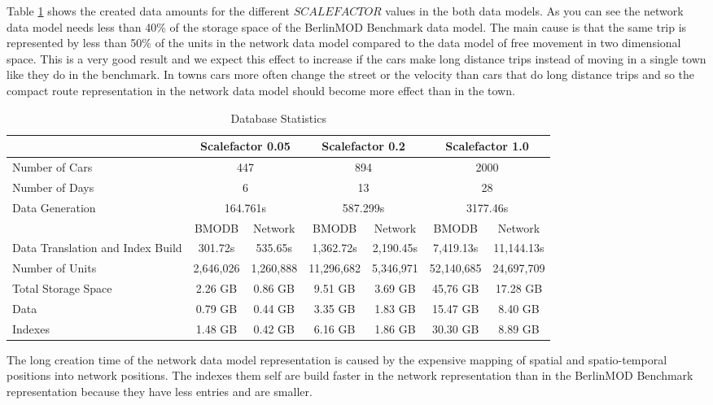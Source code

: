 \documentclass[a4paper]{article}
\newcommand{\bmodb} {BerlinMOD Benchmark}
\begin{document}
{Table \ref{tab:dbstat} shows the created data amounts for the different $SCALEFACTOR$
values in the both data models. As you can see the network data model needs less
than 40\% of the storage space of the \bmodb{} data model. The main cause is that
the same trip is represented by less than 50\% of the units in the network data model
compared to the data model of free movement in two dimensional space. This is a very
good result and we expect this effect to increase if the cars make long distance
trips instead of moving in a single town like they do in the benchmark. In towns
cars more often change the street or the velocity than cars that do long distance
trips and so the compact route representation in the network data model should become
more effect than in the town.
\begin{table}[H]
\begin{center}
\begin{scriptsize}
\begin{tabularx}{1.0\textwidth}{|X|c|c|c|c|c|c|}
\hline
&\multicolumn{2}{c|}{\textbf{Scalefactor 0.05}}&\multicolumn{2}{c|}{\textbf{Scalefactor 0.2}}&\multicolumn{2}{c|}{\textbf{Scalefactor 1.0}}\\
\hline
Number of Cars&\multicolumn{2}{c|}{447}&\multicolumn{2}{c|}{894}&\multicolumn{2}{c|}{2000}\\
\hline
Number of Days&\multicolumn{2}{c|}{6}&\multicolumn{2}{c|}{13}&\multicolumn{2}{c|}{28}\\
\hline
Data Generation&\multicolumn{2}{c|}{164.761s}&\multicolumn{2}{c|}{587.299s}&\multicolumn{2}{c|}{3177.46s}\\
\hline
&BMODB&Network&BMODB&Network&BMODB&Network\\
\hline
Data Translation
and Index Build&301.72s&535.65s&1,362.72s&2,190.45s&7,419.13s&11,144.13s\\
\hline
Number of Units&2,646,026&1,260,888&11,296,682&5,346,971&52,140,685&24,697,709\\
\hline
Total Storage Space&2.26 GB&0.86 GB&9.51 GB&3.69 GB&45,76 GB&17.28 GB\\
Data&0.79 GB&0.44 GB&3.35 GB&1.83 GB&15.47 GB& 8.40 GB\\
Indexes&1.48 GB&0.42 GB&6.16 GB&1.86 GB&30.30 GB&8.89 GB\\
\hline
\end{tabularx}
\end{scriptsize}
\caption{Database Statistics}
\label{tab:dbstat}
\end{center}
\end{table}
The long creation time of the network data model representation is
caused by the expensive mapping of spatial and spatio-temporal positions into
network positions. The indexes them self are build faster in the network representation
than in the \bmodb{} representation because they have less entries and are smaller.

}
\end{document}
